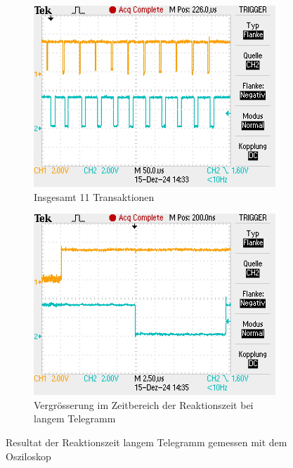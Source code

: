 \begin{figure}[H]
    \centering
    \begin{subfigure}[b]{0.45\textwidth}
        \centering
        \includegraphics[width=\linewidth]{Figures/Chap4/ESP32/Gesammte Transaktion Lang.JPG} 
        \caption{Insgesamt 11 Transaktionen}
        \label{fig:GesTransLang}
    \end{subfigure}
    \hfill 
    \begin{subfigure}[b]{0.45\textwidth}
        \centering
        \includegraphics[width=\linewidth]{Figures/Chap4/ESP32/Reaktionszeit Lang.JPG} 
        \caption{Vergrösserung im Zeitbereich der Reaktionszeit bei langem Telegramm}
        \label{fig:ReakLang}
    \end{subfigure}
    \caption{Resultat der Reaktionszeit langem Telegramm gemessen mit dem Osziloskop}
    \label{fig:ResultatOsziReaktionLang} 
\end{figure}

